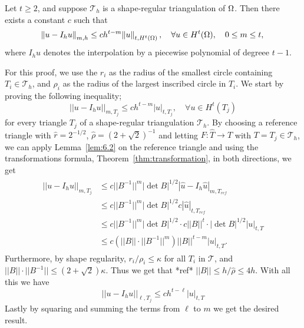 \begin{thmx}{\quad\label{thm:6.4}}
    Let $t \geq 2$, and suppose $\mathcal{T}_h$ is a shape-regular triangulation of $\Omega$. Then there exists a constant $c$ such that
    \begin{equation}
        \norm{u - I_h u}_{m,h} \leq c h^{t-m} \norm{u}_{t, H^t(\Omega)}, \quad \forall u \in H^t(\Omega), \quad 0 \leq m \leq t,
        \label{eq:6.5}
    \end{equation}
    where $I_h u$ denotes the interpolation by a piecewise polynomial of degreee $t-1$.
\end{thmx}

\begin{bev}
    For this proof, we use the $r_i$ as the radius of the smallest circle containing $T_i\in \mathcal{T}_h$, 
    and $\rho_i$ as the radius of the largest inscribed circle in $T_i$.
    We start by proving the following inequality;
    \begin{equation}
        ||u-I_h u||_{m,T_j} \leq c h^{t-m} |u|_{t,T_j}, \quad \forall u \in H^t(T_j)
    \end{equation}
    for every triangle $T_j$ of a shape-regular triangulation $\mathcal{T}_h$. 
    By choosing a reference triangle with $\hat{r} = 2^{-1/2}$, $\hat{\rho} = {(2+\sqrt{2})}^{-1}$ and letting $F : \hat{T} \to T$ with $T = T_j \in \mathcal{T}_h$, 
    we can apply Lemma~\ref{lem:6.2} on the reference triangle and using the transformations formula, Theorem~\ref{thm:transformation}, in both directions, we get
    \begin{align}
        \begin{split}
        ||u-I_h u||_{m,T_j} &\leq c ||B^{-1}||^m |\det B |^{1/2} |\hat{u} - I_h \hat{u}|_{m,T_{ref}} \\
                            &\leq c ||B^{-1}||^m |\det B |^{1/2} c | \hat{u} |_{t,T_{ref}} \\
                            &\leq c ||B^{-1}||^m |\det B |^{1/2} \cdot c ||B||^t \cdot |\det B |^{1/2} |u|_{t,T}  \\
                         &\leq c \left( ||B||  \cdot ||B^{-1}||^m \right) ||B||^{t-m} |u|_{t,T}.
        \end{split}
    \end{align}
    Furthermore, by shape regularity, $r_i / \rho_i \leq \kappa$ for all $T_i$ in $\mathcal{T}$, and $||B|| \cdot ||B^{-1}|| \leq \left( 2 + \sqrt{2} \right)\kappa$. 
    Thus we get that *ref* $||B|| \leq h/\hat{\rho}\leq 4h$. %
    With all this we have
    \begin{equation}
        ||u-I_h u||_{\ell,T_j} \leq c h^{t-\ell} |u|_{t,T}
    \end{equation}
    Lastly by squaring and summing the terms from $\ell$ to $m$ we get the desired result.
\end{bev}
